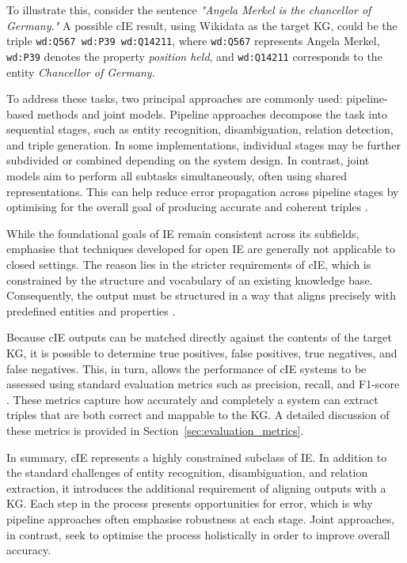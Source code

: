 \documentclass[a4paper,oneside,bibliography=totoc]{scrbook}
\begin{document}
To illustrate this, consider the sentence \textit{"Angela Merkel is the chancellor of Germany."} A possible \ac{cIE} result, using Wikidata as the target \ac{KG}, could be the triple \texttt{wd:Q567\ wd:P39\ wd:Q14211}, where \texttt{wd:Q567} represents Angela Merkel, \texttt{wd:P39} denotes the property \textit{position held}, and \texttt{wd:Q14211} corresponds to the entity \textit{Chancellor of Germany}.

To address these tasks, two principal approaches are commonly used: pipeline-based methods and joint models. Pipeline approaches decompose the task into sequential stages, such as entity recognition, disambiguation, relation detection, and triple generation. In some implementations, individual stages may be further subdivided or combined depending on the system design. In contrast, joint models aim to perform all subtasks simultaneously, often using shared representations. This can help reduce error propagation across pipeline stages by optimising for the overall goal of producing accurate and coherent triples \cite{Zhao2024,Josifoski2021}.

While the foundational goals of \ac{IE} remain consistent across its subfields, \citet{Josifoski2021} emphasise that techniques developed for open \ac{IE} are generally not applicable to closed settings. The reason lies in the stricter requirements of \ac{cIE}, which is constrained by the structure and vocabulary of an existing knowledge base. Consequently, the output must be structured in a way that aligns precisely with predefined entities and properties \cite{Josifoski2021}.

Because \ac{cIE} outputs can be matched directly against the contents of the target \ac{KG}, it is possible to determine true positives, false positives, true negatives, and false negatives. This, in turn, allows the performance of \ac{cIE} systems to be assessed using standard evaluation metrics such as precision, recall, and F1-score \cite{Josifoski2021,Josifoski2023}. These metrics capture how accurately and completely a system can extract triples that are both correct and mappable to the \ac{KG}. A detailed discussion of these metrics is provided in Section~\ref{sec:evaluation_metrics}.

In summary, \ac{cIE} represents a highly constrained subclass of \ac{IE}. In addition to the standard challenges of entity recognition, disambiguation, and relation extraction, it introduces the additional requirement of aligning outputs with a \ac{KG}. Each step in the process presents opportunities for error, which is why pipeline approaches often emphasise robustness at each stage. Joint approaches, in contrast, seek to optimise the process holistically in order to improve overall accuracy.
\end{document}
